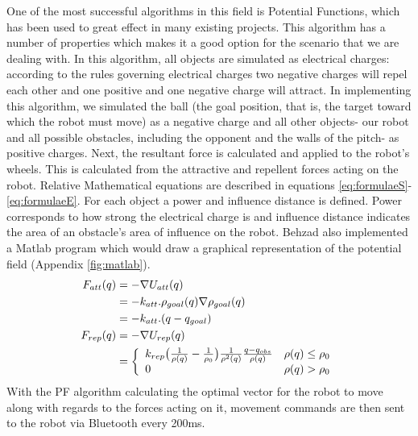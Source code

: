 \documentclass[conference,12pt]{IEEEtran}
\begin{document}
One of the most successful algorithms in this field is Potential Functions\cite{PFBook}, which has been used to great effect in many existing projects. This algorithm has a number of properties which makes it a good option for the scenario that we are dealing with. In this algorithm, all objects are simulated as electrical charges: according to the rules governing electrical charges two negative charges will repel each other and one positive and one negative charge will attract. In implementing this algorithm, we simulated the ball (the goal position, that is, the target toward which the robot must move) as a negative charge and all other objects- our robot and all possible obstacles, including the opponent and the walls of the pitch- as positive charges. Next, the resultant force is calculated and applied to the robot's wheels. This is calculated from the attractive and repellent forces acting on the robot. Relative Mathematical equations are described in equations \ref{eq:formulaeS}- \ref{eq:formulaeE}. For each object a power and influence distance is defined. Power corresponds to how strong the electrical charge is and influence distance indicates the area of an obstacle's area of influence on the robot. Behzad also implemented a Matlab program which would draw a graphical representation of the potential field (Appendix \ref{fig:matlab}).
\begin{align} \label{eq:formulaeS}
F_{att}(q) & = -\nabla U_{att}(q)\\ 
&=-k_{att}.\rho_{goal}(q)\nabla \rho_{goal}(q) \\
&=-k_{att}.(q-q_{goal}) \\
F_{rep}(q) & = -\nabla U_{rep}(q)\\
&=\left\{ 
  \begin{array}{l l}
    k_{rep} \big( {{1 \over \rho(q)} - {1 \over \rho_{0}}} \big) {1 \over \rho^2(q)} {{q - q_{obs}} \over \rho(q)} & \rho(q) \leq \rho_{0}  \\
    0 & \rho(q) > \rho_{0} \\
  \end{array} \right. \label{eq:formulaeE}
\end{align} 
With the PF algorithm calculating the optimal vector for the robot to move along with regards to the forces acting on it, movement commands are then sent to the robot via Bluetooth every 200ms.
\end{document}
